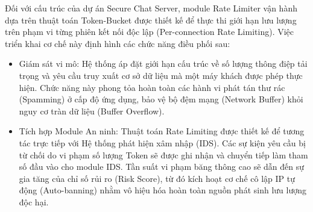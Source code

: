 Đối với cấu trúc của dự án Secure Chat Server, module Rate Limiter vận hành dựa trên thuật toán Token-Bucket được thiết kế để thực thi giới hạn lưu lượng trên phạm vi từng phiên kết nối độc lập (Per-connection Rate Limiting). Việc triển khai cơ chế này định hình các chức năng điều phối sau:
\begin{itemize}[label={-}]
    \item Giám sát vi mô: Hệ thống áp đặt giới hạn cấu trúc về số lượng thông điệp tải trọng và yêu cầu truy xuất cơ sở dữ liệu mà một máy khách được phép thực hiện. Chức năng này phong tỏa hoàn toàn các hành vi phát tán thư rác (Spamming) ở cấp độ ứng dụng, bảo vệ bộ đệm mạng (Network Buffer) khỏi nguy cơ tràn dữ liệu (Buffer Overflow).
    \item Tích hợp Module An ninh: Thuật toán Rate Limiting được thiết kế để tương tác trực tiếp với Hệ thống phát hiện xâm nhập (IDS). Các sự kiện yêu cầu bị từ chối do vi phạm số lượng Token sẽ được ghi nhận và chuyển tiếp làm tham số đầu vào cho module IDS. Tần suất vi phạm băng thông cao sẽ dẫn đến sự gia tăng của chỉ số rủi ro (Risk Score), từ đó kích hoạt cơ chế cô lập IP tự động (Auto-banning) nhằm vô hiệu hóa hoàn toàn nguồn phát sinh lưu lượng độc hại.
\end{itemize}

